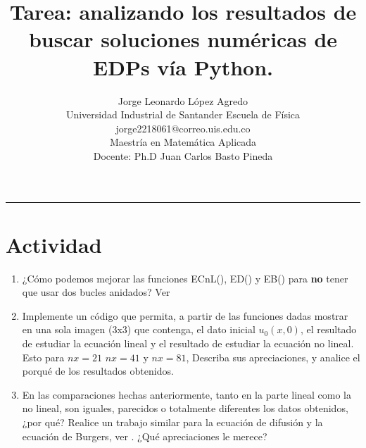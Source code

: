 \documentclass[A4,10pt]{article}
\title{{\huge \textbf{Tarea: analizando los resultados de buscar soluciones  numéricas de EDPs  vía Python.}}}
\author{Jorge Leonardo López Agredo\\ 
	\small Universidad Industrial de Santander Escuela de Física\\
	 \small jorge2218061@correo.uis.edu.co\\ 
	\small Maestría en Matemática Aplicada\\
	 Docente: Ph.D Juan Carlos Basto Pineda\\ 
	\date{}
 }
\begin{document}
	\maketitle
	\vspace*{-1.5cm}
\begin{center}\rule{0.9\textwidth}{0.1mm} \end{center}

\section{Actividad}


\begin{enumerate}
	\item ¿Cómo podemos mejorar las funciones ECnL(), ED() y EB() para \textbf{no} tener que usar dos bucles anidados? Ver \cite{LeonardoEC,LeonardoED}
		
	\item Implemente un código que permita, a partir de las funciones dadas mostrar en una sola imagen (3x3) que contenga,  el dato inicial $u_0(x,0)$, el resultado de estudiar la ecuación lineal y el resultado de estudiar la ecuación no lineal. Esto para $nx= 21$ $nx= 41$ y $nx= 81$,  Describa sus apreciaciones, y analice el porqué de los resultados obtenidos.
	
	\item En las comparaciones hechas anteriormente, tanto en la parte lineal como la no lineal, son iguales, parecidos o totalmente diferentes los datos obtenidos, ¿por qué? Realice un trabajo similar para la ecuación de difusión y la ecuación de Burgers, ver \cite{LeonardoED}. ¿Qué apreciaciones le merece?
	
\end{enumerate}
\end{document}
